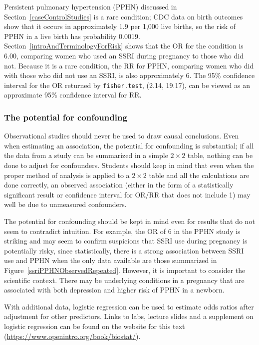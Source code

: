 Persistent pulmonary hypertension (PPHN) discussed in Section~\ref{caseControlStudies} is a rare condition; CDC data on birth outcomes show that it occurs in approximately 1.9 per 1,000 live births, so the risk of PPHN in a live birth has probability 0.0019. Section~\ref{introAndTerminologyForRisk} shows that the OR for the condition is 6.00, comparing women who used an SSRI during pregnancy to those who did not.  Because it is a rare condition, the RR for PPHN, comparing women who did with those who did not use an SSRI, is also approximately 6.  The 95\% confidence interval for the OR returned by \texttt{fisher.test}, (2.14, 19.17), can be viewed as an approximate 95\% confidence interval for RR.

\subsubsection{The potential for confounding}

Observational studies should never be used to draw causal conclusions.  Even when estimating an association, the potential for confounding is substantial; if all the data from a study can be summarized in a simple $2 \times 2$ table, nothing can be done to adjust for confounders.  Students should keep in mind that even when the proper method of analysis is applied to a $2 \times 2$ table and all the calculations are done correctly, an observed association (either in the form of a statistically significant result or confidence interval for OR/RR that does not include 1) may well be due to unmeasured confounders.

The potential for confounding should be kept in mind even for results that do not seem to contradict intuition. For example, the OR of 6 in the PPHN study is striking and may seem to confirm suspicions that SSRI use during pregnancy is potentially risky, since statistically, there is a strong association between SSRI use and PPHN when the only data available are those summarized in Figure~\ref{ssriPPHNObservedRepeated}. However, it is important to consider the scientific context. There may be underlying conditions in a pregnancy that are associated with both depression and higher risk of PPHN in a newborn.

With additional data, logistic regression can be used to estimate odds ratios after adjustment for other predictors. Links to labs, lecture slides and a supplement on logistic regression can be found on the website for this text (\url{https://www.openintro.org/book/biostat/}).


